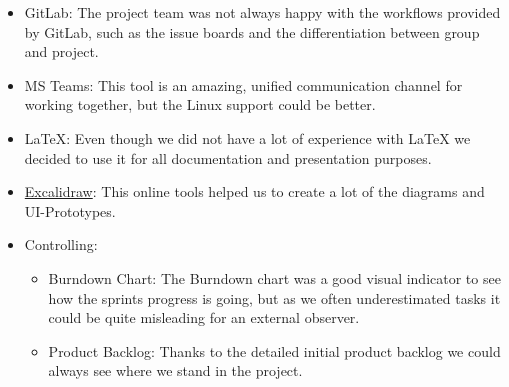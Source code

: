 \begin{itemize}
    \item GitLab: The project team was not always happy with the workflows provided by GitLab, such as the issue boards and the differentiation between group and project.
    \item MS Teams: This tool is an amazing, unified communication channel for working together, but the Linux support could be better.
    \item LaTeX: Even though we did not have a lot of experience with LaTeX we decided to use it for all documentation and presentation purposes.
    \item \href{https://excalidraw.com/}{Excalidraw}: This online tools helped us to create a lot of the diagrams and UI-Prototypes.
    \item Controlling:
    \begin{itemize}
        \item Burndown Chart: The Burndown chart was a good visual indicator to see how the sprints progress is going, but as we often underestimated tasks it could be quite misleading for an external observer.
        \item Product Backlog: Thanks to the detailed initial product backlog we could always see where we stand in the project.
    \end{itemize}
\end{itemize}
